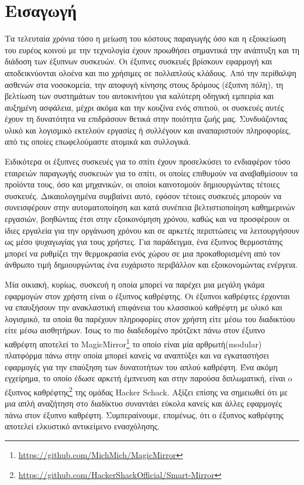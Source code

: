 \chapter{Εισαγωγή}
\label{chapter:intro}

\setlength{\parskip}{1em}
Τα τελευταία χρόνια τόσο η μείωση του κόστους παραγωγής όσο και η εξοικείωση του ευρέος κοινού με την τεχνολογία έχουν προωθήσει σημαντικά την ανάπτυξη και τη διάδοση των έξυπνων συσκευών. Οι έξυπνες συσκευές βρίσκουν εφαρμογή και αποδεικνύονται ολοένα και πιο χρήσιμες σε πολλαπλούς κλάδους. Από την περίθαλψη ασθενών στα νοσοκομεία, την αποφυγή κίνησης στους δρόμους (έξυπνη πόλη), τη βελτίωση των συστημάτων του αυτοκινήτου για καλύτερη οδηγική εμπειρία και αυξημένη ασφάλεια, μέχρι ακόμα και την κουζίνα ενός σπιτιού, οι συσκευές αυτές έχουν τη δυνατότητα να επιδράσουν θετικά στην ποιότητα ζωής μας. Συνδυάζοντας υλικό και λογισμικό εκτελούν εργασίες ή συλλέγουν και αναπαριστούν πληροφορίες, από τις οποίες επωφελούμαστε ατομικά και συλλογικά. 

Ειδικότερα οι έξυπνες συσκευές για το σπίτι έχουν προσελκύσει το ενδιαφέρον τόσο εταιρειών παραγωγής συσκευών για το σπίτι, οι οποίες επιθυμούν να αναβαθμίσουν τα προϊόντα τους, όσο και μηχανικών, οι οποίοι καινοτομούν δημιουργώντας τέτοιες συσκευές. Δικαιολογημένα συμβαίνει αυτό, εφόσον τέτοιες συσκευές μπορούν να συνεισφέρουν στην αυτοματοποίηση και κατά συνέπεια βελτιστιοποίηση καθημερινών εργασιών, βοηθώντας έτσι στην εξοικονόμηση χρόνου, καθώς και να προσφέρουν οι ίδιες εργαλεία για την οργάνωση χρόνου και σε αρκετές περιπτώσεις να λειτουργήσουν ως μέσο ψυχαγωγίας για τους χρήστες. Για παράδειγμα, ένα έξυπνος θερμοστάτης μπορεί να ρυθμίζει την θερμοκρασία ενός χώρου σε μια προκαθορισμένη από τον άνθρωπο τιμή δημιουργώντας ένα ευχάριστο περιβάλλον και εξοικονομώντας ενέργεια.

Μία οικιακή, κυρίως, συσκευή η οποία μπορεί να παρέχει μια μεγάλη γκάμα εφαρμογών στον χρήστη είναι ο έξυπνος καθρέφτης. Οι έξυπνοι καθρέφτες έρχονται να επαυξήσουν την ανακλαστική επιφάνεια του κλασσικού καθρέφτη με υλικό και λογισμικό, τα οποία θα παρέχουν πληροφορίες στον χρήστη είτε μέσω του διαδικτύου είτε μέσω αισθητήρων. Ίσως το πιο διαδεδομένο πρότζεκτ πάνω στον έξυπνο καθρέφτη αποτελεί το MagicMirror\footnote{\href{https://github.com/MichMich/MagicMirror}{https://github.com/MichMich/MagicMirror}} το οποίο είναι μία αρθρωτή(modular) πλατφόρμα πάνω στην οποία μπορεί κανείς να αναπτύξει και να εγκαταστήσει εφαρμογές για την επαύξηση των δυνατοτήτων του απλού καθρέφτη. Ένα ακόμη εγχείρημα, το οποίο έδωσε αρκετή έμπνευση και στην παρούσα διπλωματική, είναι o έξυπνος καθρέφτης\footnote{\href{https://github.com/HackerShackOfficial/Smart-Mirror}{https://github.com/HackerShackOfficial/Smart-Mirror}} της ομάδας Hacker Schack. Αξίζει επίσης να σημειωθεί ότι με μια απλή αναζήτηση στο διαδίκτυο συναντάει εύκολα κανείς και άλλες εφαρμογές πάνω στον έξυπνο καθρέφτη. Συμπεραίνουμε, επομένως, ότι ο έξυπνος καθρέφτης αποτελεί ελκυστικό αντικείμενο ενασχόλησης.




